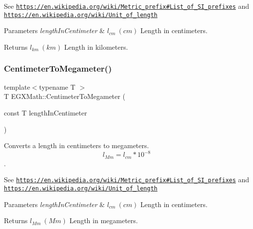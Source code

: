 See \href{https://en.wikipedia.org/wiki/Metric_prefix#List_of_SI_prefixes}{\tt https\+://en.\+wikipedia.\+org/wiki/\+Metric\+\_\+prefix\#\+List\+\_\+of\+\_\+\+S\+I\+\_\+prefixes} and \href{https://en.wikipedia.org/wiki/Unit_of_length}{\tt https\+://en.\+wikipedia.\+org/wiki/\+Unit\+\_\+of\+\_\+length} 
\begin{DoxyParams}{Parameters}
{\em length\+In\+Centimeter} & $ l_{cm}\ (cm)$ Length in centimeters. \\
\hline
\end{DoxyParams}
\begin{DoxyReturn}{Returns}
$ l_{km}\ (km)$ Length in kilometers. 
\end{DoxyReturn}
\mbox{\label{group___e_g_x_math-_conversions-_length_conversions-_centimeter-_s_i_ga5ba81fb6190e6ce0032410d703d5073b}} 
\subsubsection{\texorpdfstring{Centimeter\+To\+Megameter()}{CentimeterToMegameter()}}
{\footnotesize\ttfamily template$<$typename T $>$ \\
T E\+G\+X\+Math\+::\+Centimeter\+To\+Megameter (\begin{DoxyParamCaption}\item[{const T}]{length\+In\+Centimeter }\end{DoxyParamCaption})}



Converts a length in centimeters to megameters. \[ l_{Mm}=l_{cm} * 10^{-8} \]. 

See \href{https://en.wikipedia.org/wiki/Metric_prefix#List_of_SI_prefixes}{\tt https\+://en.\+wikipedia.\+org/wiki/\+Metric\+\_\+prefix\#\+List\+\_\+of\+\_\+\+S\+I\+\_\+prefixes} and \href{https://en.wikipedia.org/wiki/Unit_of_length}{\tt https\+://en.\+wikipedia.\+org/wiki/\+Unit\+\_\+of\+\_\+length} 
\begin{DoxyParams}{Parameters}
{\em length\+In\+Centimeter} & $ l_{cm}\ (cm)$ Length in centimeters. \\
\hline
\end{DoxyParams}
\begin{DoxyReturn}{Returns}
$ l_{Mm}\ (Mm)$ Length in megameters. 
\end{DoxyReturn}
\mbox{\label{group___e_g_x_math-_conversions-_length_conversions-_centimeter-_s_i_gaebbc38cdc9fa18257e8cf4a0bbbb117a}} 
